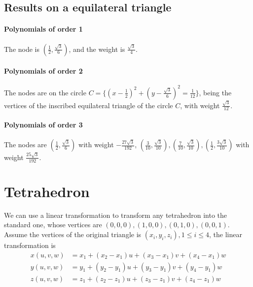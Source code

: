 \documentclass[conference,onecolumn, 12pt]{IEEEtran}
\begin{document}

\subsection{Results on a equilateral triangle}
\paragraph{Polynomials of order 1}
The node is $\left(\frac{1}{2},\frac{\sqrt{3}}{6}\right)$, and the weight is $\frac{\sqrt{3}}{4}$.
\paragraph{Polynomials of order 2}
The nodes are on the circle $C = \{\left(x-\frac{1}{2}\right)^2+\left(y-\frac{\sqrt{3}}{6}\right)^2=\frac{1}{12}\}$, being the vertices of the inscribed equilateral triangle of the circle $C$, with weight $\frac{\sqrt{3}}{12}$.
\paragraph{Polynomials of order 3}
The nodes are $\left(\frac{1}{2},\frac{\sqrt{3}}{6}\right)$ with weight $-\frac{27\sqrt{3}}{192}$, $\left(\frac{3}{10},\frac{\sqrt{3}}{10}\right),\left(\frac{7}{10},\frac{\sqrt{3}}{10}\right),\left(\frac{1}{2},\frac{3\sqrt{3}}{10}\right)$ with weight $\frac{25\sqrt{3}}{192}$.

\section{Tetrahedron}
We can use a linear transformation to transform any tetrahedron into the standard one, whose vertices are $(0,0,0), (1,0,0), (0,1,0), (0,0,1)$. Assume the vertices of the original triangle is $(x_i,y_i,z_i),1\leq i\leq 4$, the linear transformation is 
\begin{equation}
    \label{3dimtrans}
    \begin{split}
        x(u,v,w) &= x_1+(x_2-x_1)u+(x_3-x_1)v+(x_4-x_1)w\\
        y(u,v,w) &= y_1+(y_2-y_1)u+(y_3-y_1)v+(y_4-y_1)w\\
        z(u,v,w)&= z_1+(z_2-z_1)u+(z_3-z_1)v+(z_4-z_1)w\\
    \end{split}
\end{equation}
\end{document}
